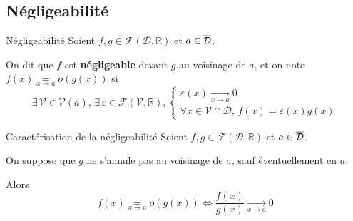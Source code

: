 \subsection{Négligeabilité}

    \begin{defi}{Négligeabilité}{}
        Soient $f,g \in \mathcal{F}(\mathcal{D},\mathbb{R})$ et $a \in \overline{\mathcal{D}}$. 
    
        On dit que $f$ est \textbf{négligeable} devant $g$ au voisinage de $a$, et on note $ f(x) \underset{x \rightarrow a}{=} o(g(x))$ si 
        \[ \exists \, \mathcal{V} \in \mathcal{V}(a), \, \exists \, \varepsilon \in \mathcal{F}(\mathcal{V}, \mathbb{R}), \left\{ \begin{array}{ll}
        \varepsilon(x) \underset{x \rightarrow a}{\longrightarrow} 0 \\
        \forall x \in \mathcal{V} \cap \mathcal{D}, \, f(x) = \varepsilon(x)g(x)
    \end{array} \right. \]
    \end{defi}
    
    \begin{theo}{Caractérisation de la négligeabilité}{}
        Soient $f,g \in \mathcal{F}(\mathcal{D},\mathbb{R})$ et $a \in \overline{\mathcal{D}}$. 
    
        On suppose que $g$ ne s’annule pas au voisinage de $a$, sauf éventuellement en $a$.
    
        Alors \[ f(x) \underset{x \rightarrow a}{=} o(g(x)) \iff \frac{f(x)}{g(x)} \underset{x \rightarrow a}{\longrightarrow} 0 \]
    \end{theo}
    
